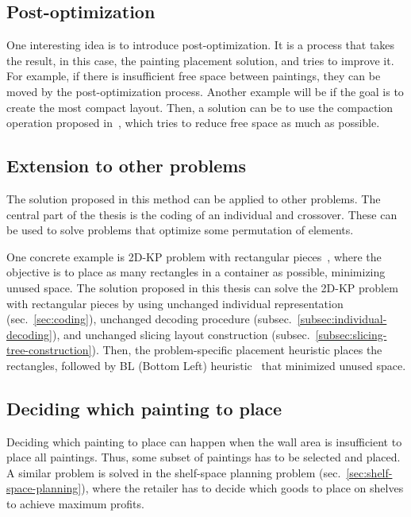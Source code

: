 \subsection{Post-optimization}\label{subsec:post-optimization}

One interesting idea is to introduce post-optimization.
It is a process that takes the result, in this case, the painting placement solution,
and tries to improve it.
For example, if there is insufficient free space between paintings, they can be moved by the post-optimization process.
Another example will be if the goal is to create the most compact layout.
Then, a solution can be to use the compaction operation proposed in~\cite{laiSlicingTreeComplete2001},
which tries to reduce free space as much as possible.

\subsection{Extension to other problems}\label{subsec:extension-to-other-problems}

The solution proposed in this method can be applied to other problems.
The central part of the thesis is the coding of an individual and crossover.
These can be used to solve problems that optimize some permutation of elements.

One concrete example is 2D-KP problem with rectangular pieces~\cite{bortfeldtGeneticAlgorithmTwodimensional2009},
where the objective is to place as many rectangles in a container as possible,
minimizing unused space.
The solution proposed in this thesis can solve the 2D-KP problem with rectangular pieces by
using unchanged individual representation (sec.~\ref{sec:coding}), unchanged decoding procedure (subsec.~\ref{subsec:individual-decoding}),
and unchanged slicing layout construction (subsec.~\ref{subsec:slicing-tree-construction}).
Then, the problem-specific placement heuristic places the rectangles,
followed by BL (Bottom Left) heuristic~\cite{chazelleBottomnLeftBinPackingHeuristic1983} that minimized unused space.

\subsection{Deciding which painting to place}\label{subsec:deciding-which-painting-to-place}
Deciding which painting to place can happen when the wall area is insufficient to place all paintings.
Thus, some subset of paintings has to be selected and placed.
A similar problem is solved in the shelf-space planning problem (sec.~\ref{sec:shelf-space-planning}),
where the retailer has to decide which goods to place on shelves to achieve maximum profits.

